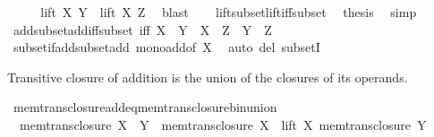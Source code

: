 \begin{isabellebody}
\ \ \isamarkupfalse%
\ \isamarkupfalse%
\ {\isachardoublequoteopen}lift\ X\ Y\ {\isasymsubseteq}\ lift\ X\ Z{\isachardoublequoteclose}\ \isamarkupfalse%
\ blast\isanewline
\ \ \isamarkupfalse%
\ lift{\isacharunderscore}{\kern0pt}subset{\isacharunderscore}{\kern0pt}lift{\isacharunderscore}{\kern0pt}iff{\isacharunderscore}{\kern0pt}subset\ \isamarkupfalse%
\ {\isacharquery}{\kern0pt}thesis\ \isamarkupfalse%
\ simp\isanewline
{}\isamarkupfalse%
%
\endisatagproof
{\isafoldproof}%
%
\isadelimproof
\isanewline
%
\endisadelimproof
\isanewline
{}\isamarkupfalse%
\ add{\isacharunderscore}{\kern0pt}subset{\isacharunderscore}{\kern0pt}add{\isacharunderscore}{\kern0pt}iff{\isacharunderscore}{\kern0pt}subset\ {\isacharbrackleft}{\kern0pt}iff{\isacharbrackright}{\kern0pt}{\isacharcolon}{\kern0pt}\ {\isachardoublequoteopen}X\ {\isacharplus}{\kern0pt}\ Y\ {\isasymsubseteq}\ X\ {\isacharplus}{\kern0pt}\ Z\ {\isasymlongleftrightarrow}\ Y\ {\isasymsubseteq}\ Z{\isachardoublequoteclose}\isanewline
%
\isadelimproof
\ \ %
\endisadelimproof
%
\isatagproof
{}\isamarkupfalse%
\ subset{\isacharunderscore}{\kern0pt}if{\isacharunderscore}{\kern0pt}add{\isacharunderscore}{\kern0pt}subset{\isacharunderscore}{\kern0pt}add\ mono{\isacharunderscore}{\kern0pt}add{\isacharbrackleft}{\kern0pt}of\ X{\isacharbrackright}{\kern0pt}\ \isamarkupfalse%
\ {\isacharparenleft}{\kern0pt}auto\ del{\isacharcolon}{\kern0pt}\ subsetI{\isacharparenright}{\kern0pt}%
\endisatagproof
{\isafoldproof}%
%
\isadelimproof
%
\endisadelimproof
%
\begin{isamarkuptext}%
Transitive closure of addition is the union of the closures of its operands.%
\end{isamarkuptext}\isamarkuptrue%
\isamarkupfalse%
\ mem{\isacharunderscore}{\kern0pt}trans{\isacharunderscore}{\kern0pt}closure{\isacharunderscore}{\kern0pt}add{\isacharunderscore}{\kern0pt}eq{\isacharunderscore}{\kern0pt}mem{\isacharunderscore}{\kern0pt}trans{\isacharunderscore}{\kern0pt}closure{\isacharunderscore}{\kern0pt}bin{\isacharunderscore}{\kern0pt}union{\isacharcolon}{\kern0pt}\isanewline
\ \ {\isachardoublequoteopen}mem{\isacharunderscore}{\kern0pt}trans{\isacharunderscore}{\kern0pt}closure\ {\isacharparenleft}{\kern0pt}X\ {\isacharplus}{\kern0pt}\ Y{\isacharparenright}{\kern0pt}\ {\isacharequal}{\kern0pt}\ mem{\isacharunderscore}{\kern0pt}trans{\isacharunderscore}{\kern0pt}closure\ X\ {\isasymunion}\ lift\ X\ {\isacharparenleft}{\kern0pt}mem{\isacharunderscore}{\kern0pt}trans{\isacharunderscore}{\kern0pt}closure\ Y{\isacharparenright}{\kern0pt}{\isachardoublequoteclose}\isanewline

\end{isabellebody}
